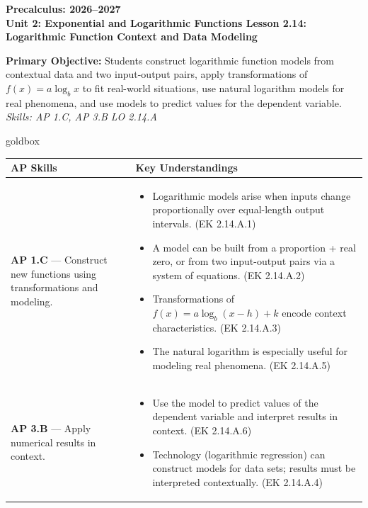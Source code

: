 \documentclass[10pt]{article}
\newcommand{\CourseName}{Precalculus}
\newcommand{\SchoolYear}{2026--2027}
\newcommand{\UnitNumberName}{Unit 2: Exponential and Logarithmic Functions \quad}
\newcommand{\LessonNumberName}{Lesson 2.14: Logarithmic Function Context and Data Modeling}
\begin{document}
\begin{center}
    {\Large\bfseries \CourseName: \SchoolYear \\
    {\small\bfseries \UnitNumberName \LessonNumberName}}
\end{center}

\begin{tcolorbox}[colback=sky, colframe=navy, boxrule=0.9pt, arc=2mm,
    left=2mm, right=2mm, top=1.5mm, bottom=1.5mm]
    \textbf{Primary Objective:} Students construct logarithmic function models from contextual
    data and two input-output pairs, apply transformations of $f(x) = a\log_b x$ to fit
    real-world situations, use natural logarithm models for real phenomena, and use models to
    predict values for the dependent variable.
    \hfill\textit{\small Skills: AP 1.C, AP 3.B \quad LO 2.14.A}
\end{tcolorbox}

\renewcommand{\arraystretch}{1.6}
\begin{skillbox}{goldbox}
\begin{tabularx}{\linewidth}{@{}X X@{}}
\textbf{AP Skills} &
\textbf{Key Understandings} \\
\midrule
\textbf{AP 1.C} --- Construct new functions using transformations and modeling. &
\begin{itemize}[leftmargin=1.2em,itemsep=2pt,topsep=0pt]
  \item Logarithmic models arise when inputs change proportionally over equal-length output
        intervals. (EK 2.14.A.1)
  \item A model can be built from a proportion + real zero, or from two input-output pairs
        via a system of equations. (EK 2.14.A.2)
  \item Transformations of $f(x)=a\log_b(x-h)+k$ encode context characteristics.
        (EK 2.14.A.3)
  \item The natural logarithm is especially useful for modeling real phenomena.
        (EK 2.14.A.5)
\end{itemize} \\
\textbf{AP 3.B} --- Apply numerical results in context. &
\begin{itemize}[leftmargin=1.2em,itemsep=2pt,topsep=0pt]
  \item Use the model to predict values of the dependent variable and interpret results
        in context. (EK 2.14.A.6)
  \item Technology (logarithmic regression) can construct models for data sets; results
        must be interpreted contextually. (EK 2.14.A.4)
\end{itemize} \\
\end{tabularx}
\end{skillbox}
\end{document}
